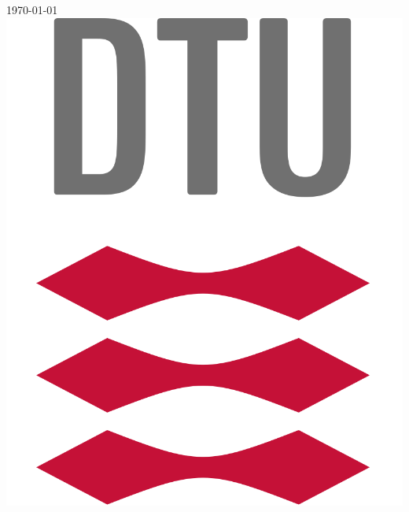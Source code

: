\documentclass[11pt]{article}
\begin{document}
\begin{titlepage}


{\large \today}\\[2cm] %


\includegraphics[scale=0.07]{Figures/dtu_logo.png}\\ %
 

\vfill %

\end{titlepage}
\end{document}
